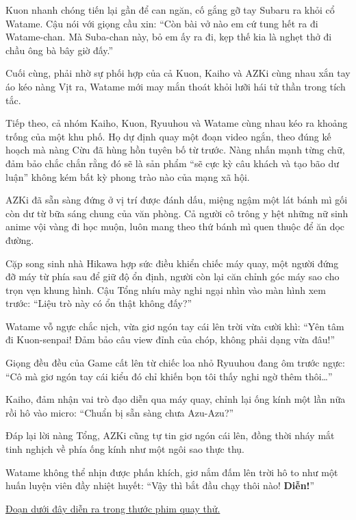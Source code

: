 \documentclass[../main.tex]{subfiles}
\begin{document}
Kuon nhanh chóng tiến lại gần để can ngăn, cố gắng gỡ tay Subaru ra khỏi cổ Watame. Cậu nói với giọng cầu xin: ``Còn bài vở nào em cứ tung hết ra đi Watame-chan. Mà Suba-chan này, bỏ em ấy ra đi, kẹp thế kia là nghẹt thở đi chầu ông bà bây giờ đấy.''

Cuối cùng, phải nhờ sự phối hợp của cả Kuon, Kaiho và AZKi cùng nhau xắn tay áo kéo nàng Vịt ra, Watame mới may mắn thoát khỏi lưỡi hái tử thần trong tích tắc.

\ct

Tiếp theo, cả nhóm Kaiho, Kuon, Ryuuhou và Watame cùng nhau kéo ra khoảng trống của một khu phố. Họ dự định quay một đoạn video ngắn, theo đúng kế hoạch mà nàng Cừu đã hùng hồn tuyên bố từ trước. Nàng nhấn mạnh từng chữ, đảm bảo chắc chắn rằng đó sẽ là sản phẩm ``sẽ cực kỳ câu khách và tạo bão dư luận'' không kém bất kỳ phong trào nào của mạng xã hội.

AZKi đã sẵn sàng đứng ở vị trí được đánh dấu, miệng ngậm một lát bánh mì gối còn dư từ bữa sáng chung của văn phòng. Cả người cô trông y hệt những nữ sinh anime vội vàng đi học muộn, luôn mang theo thứ bánh mì quen thuộc để ăn dọc đường.

Cặp song sinh nhà Hikawa hợp sức điều khiển chiếc máy quay, một người đứng đỡ máy từ phía sau để giữ độ ổn định, người còn lại căn chỉnh góc máy sao cho trọn vẹn khung hình. Cậu Tổng nhíu mày nghi ngại nhìn vào màn hình xem trước: ``Liệu trò này có ổn thật không đấy?''

Watame vỗ ngực chắc nịch, vừa giơ ngón tay cái lên trời vừa cười khì: ``Yên tâm đi Kuon-senpai! Đảm bảo câu view đỉnh của chóp, không phải dạng vừa đâu!''

Giọng đều đều của Game cất lên từ chiếc loa nhỏ Ryuuhou đang ôm trước ngực: ``Cô mà giơ ngón tay cái kiểu đó chỉ khiến bọn tôi thấy nghi ngờ thêm thôi\dots''

Kaiho, đảm nhận vai trò đạo diễn qua máy quay, chỉnh lại ống kính một lần nữa rồi hô vào micro: ``Chuẩn bị sẵn sàng chưa Azu-Azu?''

Đáp lại lời nàng Tổng, AZKi cũng tự tin giơ ngón cái lên, đồng thời nháy mắt tinh nghịch về phía ống kính như một ngôi sao thực thụ.

Watame không thể nhịn được phấn khích, giơ nắm đấm lên trời hô to như một huấn luyện viên đầy nhiệt huyết: ``Vậy thì bắt đầu chạy thôi nào! \textbf{Diễn!}''

\begin{center}
  \uline{Đoạn dưới đây diễn ra trong thước phim quay thử.}
\end{center}
\end{document}
